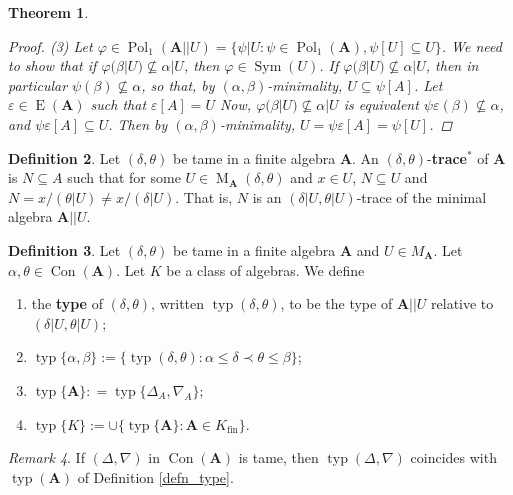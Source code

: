 \documentclass{amsart}
\theoremstyle{plain}
\newtheorem{theorem}{Theorem}[section]
\theoremstyle{definition}
\newtheorem{definition}[theorem]{Definition}
\theoremstyle{remark}
\newtheorem{remark}[theorem]{Remark}
\def\phi{\varphi}
\def\epsilon{\varepsilon}
\DeclareMathOperator{\Con}{Con}
\DeclareMathOperator{\Pol}{Pol}
\DeclareMathOperator{\typ}{typ}
\DeclareMathOperator{\Sym}{Sym}
\DeclareMathOperator{\Id}{E}
\DeclareMathOperator{\M}{M}
\DeclareMathOperator{\fin}{fin}
\begin{document}
\begin{theorem}
\begin{proof}
        (3) Let $\phi \in \Pol_1(\mathbf{A}||U)=\{\psi|U : \psi \in \Pol_1(\mathbf{A}), \psi[U] \subseteq U\}$. 
        We need to show that if $\phi(\beta | U) \nsubseteq \alpha|U$, then $\phi \in \Sym(U)$. 
        If $\phi(\beta | U) \nsubseteq \alpha|U$, then in particular $\psi(\beta) \nsubseteq \alpha$, so that, by $(\alpha,\beta)$-minimality, $U \subseteq \psi[A]$. 
        Let $\epsilon \in \Id(\mathbf{A})$ such that $\epsilon[A]=U$
        Now, $\phi(\beta | U) \nsubseteq \alpha|U$ is equivalent $\psi \epsilon (\beta) \nsubseteq \alpha$, and $\psi \epsilon[A] \subseteq U$. 
        Then by $(\alpha, \beta)$-minimality, $U =\psi \epsilon[A] = \psi[U]$.  
    \end{proof}
\end{theorem}

\begin{definition}
    Let $(\delta, \theta)$ be tame in a finite algebra $\mathbf{A}$. 
    An $(\delta, \theta)$-\textbf{trace$^*$} of $\mathbf{A}$ is 
    $N \subseteq A$ such that for some $U \in \M_{\mathbf{A}}(\delta, \theta)$ and $x \in U$, $N\subseteq U$ and $N=x/(\theta|U) \neq x/(\delta|U)$. 
    That is, $N$ is an $(\delta|U, \theta|U)$-trace of the minimal algebra $\mathbf{A}||U$. 
\end{definition}

\begin{definition}
    Let $(\delta, \theta)$ be tame in a finite algebra $\mathbf{A}$ and $U \in M_{\mathbf{A}}$.
    Let $\alpha, \theta \in \Con(\mathbf{A})$. 
    Let $K$ be a class of algebras. 
    We define 
    \begin{enumerate}
        \item the \textbf{type} of $(\delta, \theta)$, written $\typ(\delta, \theta)$, to be the type of
        $\mathbf{A}||U$ relative to $(\delta|U, \theta|U)$;
        \item $\typ\{\alpha, \beta\} :=\{ \typ(\delta, \theta) : \alpha \le \delta \prec \theta \le \beta\}$;
        \item $\typ\{\mathbf{A}\}: =\typ\{\Delta_A, \nabla_A\}$; 
        \item $\typ\{K\}:=\cup\{\typ\{\mathbf{A}\} : \mathbf{A} \in K_{\fin}\}$. 
    \end{enumerate}
\end{definition}

\begin{remark}
    If $(\Delta, \nabla)$ in $\Con(\mathbf{A})$ is tame, then $\typ(\Delta, \nabla)$ coincides with $\typ(\mathbf{A})$ of Definition \ref{defn_type}. 
\end{remark}
\end{document}
